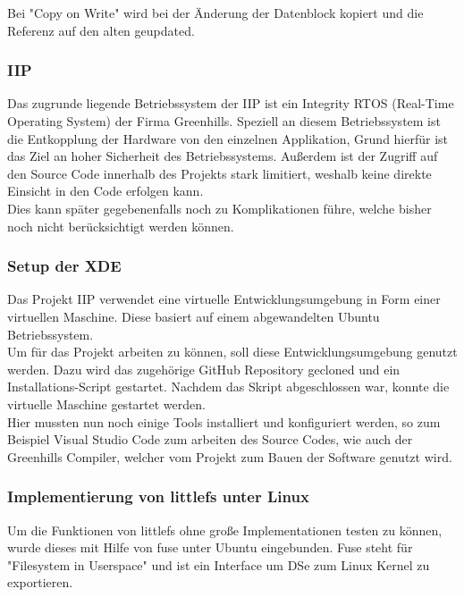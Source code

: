 Bei "Copy on Write" wird bei der Änderung der Datenblock kopiert und die Referenz auf den alten geupdated.




\subsubsection{IIP}
Das zugrunde liegende Betriebssystem der IIP ist ein Integrity RTOS (Real-Time Operating System) der Firma Greenhills.
Speziell an diesem Betriebssystem ist die Entkopplung der Hardware von den einzelnen Applikation,
Grund hierfür ist das Ziel an hoher Sicherheit des Betriebssystems.
Außerdem ist der Zugriff auf den Source Code innerhalb des Projekts stark limitiert, weshalb keine direkte Einsicht in den Code erfolgen kann.\\

Dies kann später gegebenenfalls noch zu Komplikationen führe, welche bisher noch nicht berücksichtigt werden können.\\



\subsubsection{Setup der XDE}
Das Projekt IIP verwendet eine virtuelle Entwicklungsumgebung in Form einer virtuellen Maschine.
Diese basiert auf einem abgewandelten Ubuntu Betriebssystem.\\

Um für das Projekt arbeiten zu können, soll diese Entwicklungsumgebung genutzt werden.
Dazu wird das zugehörige GitHub Repository gecloned und ein Installations-Script gestartet.
Nachdem das Skript abgeschlossen war, konnte die virtuelle Maschine gestartet werden.\\

Hier mussten nun noch einige Tools installiert und konfiguriert werden,
so zum Beispiel Visual Studio Code zum arbeiten des Source Codes, wie auch der Greenhills Compiler, welcher vom Projekt zum Bauen der Software genutzt wird.\\


\subsubsection{Implementierung von littlefs unter Linux}
Um die Funktionen von littlefs ohne große Implementationen testen zu können, wurde dieses mit Hilfe von fuse unter Ubuntu eingebunden.
Fuse steht für "Filesystem in Userspace" und ist ein Interface um \acl{DS}e zum Linux Kernel zu exportieren.\\

